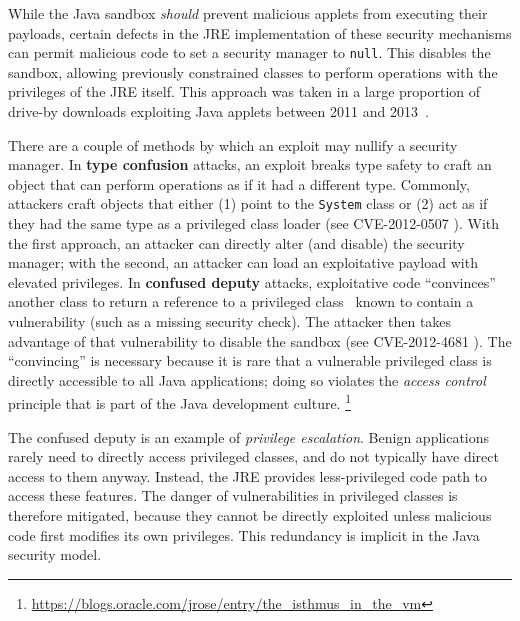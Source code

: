 \documentclass{sig-alternate}
\begin{document}
%
While the Java sandbox \textit{should} prevent malicious applets from
executing their payloads, certain defects in the JRE implementation of these security mechanisms can permit
malicious code to set a security manager to \texttt{null}.  
This disables the sandbox, allowing
previously constrained classes to perform operations with the privileges of 
the JRE itself. 
This approach was taken in a large proportion of drive-by downloads exploiting
Java applets between 2011 and 2013~\cite{fireeye_2013}. 
%

There are a couple of methods by which an exploit may nullify a security manager.
In \textbf{type confusion} attacks, an exploit breaks type
safety to craft an object that can perform operations as if it had
a different type.  Commonly, attackers craft objects that either
(1) point to the \texttt{System} class or (2) act as if they had
the same type as a privileged class loader (see CVE-2012-0507 \cite{_vulnerability_2012_0507}).
With the first approach, an attacker can directly alter (and disable) the
security manager; with the second, an attacker can load an exploitative
payload with elevated privileges.  In \textbf{confused deputy} attacks,
exploitative code ``convinces'' another 
class to return a reference to a privileged class~\cite{hardy_confused_1988}
known to contain a vulnerability (such as a missing security check).  The
attacker then takes advantage of that vulnerability to disable the sandbox 
(see CVE-2012-4681 \cite{_vulnerability_2012_4681}).
The ``convincing'' is necessary
because it is rare that a vulnerable privileged class is directly accessible
to all Java applications; doing so violates the \textit{access
control} principle that is part of the Java development culture.%
\footnote{\url{https://blogs.oracle.com/jrose/entry/the_isthmus_in_the_vm}%
} 

The confused deputy is an example of \emph{privilege escalation}.  Benign
applications rarely need to directly access privileged classes, and do not
typically have direct access to them anyway. 
Instead, the JRE provides less-privileged code path
to access these features. The danger of vulnerabilities in privileged
classes is therefore mitigated, because they cannot be directly exploited
unless malicious code first modifies its own privileges. 
This redundancy is implicit in the Java security model. %
\end{document}
